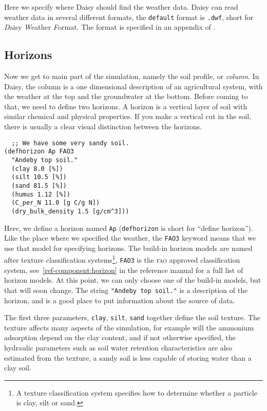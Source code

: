 \documentclass[a4paper]{article}
\begin{document}
Here we specify where Daisy should find the weather data.  Daisy
can read weather data in several different formats, the
\texttt{default} format is \texttt{.dwf}, short for \emph{D}aisy
\emph{W}eather \emph{F}ormat.  The format is specified in an appendix
 of \cite{dina81}.

\subsection{Horizons}
\label{sec:ex-hor}

Now we get to main part of the simulation, namely the soil profile, or
\emph{column}.  In Daisy, the column is a one dimensional
description of an agricultural system, with the weather at the top and
the groundwater at the bottom.  Before coming to that, we need to
define two horizons.  A horizon is a vertical layer of soil with
similar chemical and physical properties.  If you make a vertical cut
in the soil, there is usually a clear visual distinction between the
horizons.

\begin{verbatim}
  ;; We have some very sandy soil.
(defhorizon Ap FAO3
  "Andeby top soil."
  (clay 8.0 [%])
  (silt 10.5 [%])
  (sand 81.5 [%])
  (humus 1.12 [%])
  (C_per_N 11.0 [g C/g N])
  (dry_bulk_density 1.5 [g/cm^3]))
\end{verbatim}

Here, we define a horizon named \texttt{Ap} (\texttt{defhorizon} is
short for ``define horizon'').  Like the place where we specified the
weather, the \texttt{FAO3} keyword means that we use that model for
specifying horizons.  The build-in horizon models are named after
texture classification systems\footnote{A texture classification
  system specifies how to determine whether a particle is clay, silt
  or sand.}, \texttt{FAO3} is the \textsc{fao} approved classification
system, see~\ref{ref-component:horizon} in the reference manual for a
full list of horizon models. At this point, we can only choose one of
the build-in models, but that will soon change.  The string
\texttt{"Andeby top soil."} is a description of the horizon, and is a
good place to put information about the source of data.

The first three parameters, \texttt{clay}, \texttt{silt},
\texttt{sand} together define the soil texture.  The texture affects
many aspects of the simulation, for example will the ammonium
adsorption depend on the clay content, and if not otherwise specified,
the hydraulic parameters such as soil water retention characteristics
are also estimated from the texture, a sandy soil is less capable of
storing water than a clay soil.
\end{document}
